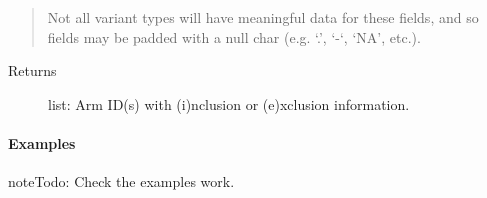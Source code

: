 \documentclass[letterpaper,10pt,english]{sphinxmanual}
\begin{document}
\begin{fulllineitems}
\begin{fulllineitems}
\begin{quote}
\begin{description}
Not all variant types will have meaningful data for these fields,
and so fields may be padded with a null char (e.g. ‘.’, ‘-‘, ‘NA’,
etc.).


\end{description}\end{quote}
\begin{description}
\item[{Returns}] \leavevmode
list:  Arm ID(s) with (i)nclusion or (e)xclusion information.

\end{description}
\paragraph{Examples}

%
\begin{sphinxVerbatim}[commandchars=\\\{\}]
  
\end{sphinxVerbatim}

\begin{sphinxadmonition}{note}{\label{matchbox_api_utils:index-3}Todo:}
Check the examples work.
\end{sphinxadmonition}

\end{fulllineitems}



\end{fulllineitems}
\end{document}
